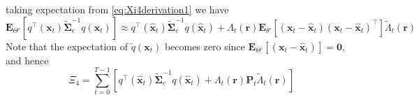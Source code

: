 \documentclass[]{article}
\begin{document}
taking expectation from \ref{eq:Xi4derivation1} we have 
\begin{equation}\label{eq:Xi3derivation3}
\mathbf E_{\Theta'}\left[ q^\top(\mathbf x_t)\tilde{\boldsymbol\Sigma}_e^{-1}q(\mathbf x_t)\right]\approx q^\top(\mathbf {\hat x}_t)\tilde{\boldsymbol\Sigma}_e^{-1}q(\mathbf {\hat x}_t)  +\Lambda_t(\mathbf r)\mathbf E_{\theta'}\left[  (\mathbf x_t - \mathbf  {\hat x}_t) (\mathbf x_t - \mathbf  {\hat x}_t)^\top\right]\tilde{\Lambda}_t(\mathbf r)
\end{equation}
Note that the expectation of $\tilde{q}(\mathbf x_t)$ becomes zero since $\mathbf E_{\Theta'}\left[(\mathbf x_t - \mathbf  {\hat x}_t)\right]= \mathbf 0$, and hence
\begin{equation}
 \Xi_4= \sum_{t=0}^{T-1}\left[q^\top(\mathbf{\hat x}_t)\tilde{\boldsymbol\Sigma}_e^{-1}q(\mathbf{\hat x}_t)+\Lambda_t(\mathbf r)\mathbf P_t \tilde{\Lambda}_t(\mathbf r)\right]
\end{equation}
\end{document}

